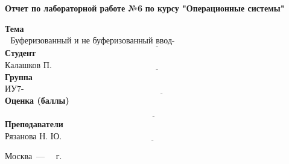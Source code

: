 \begin{titlepage}
	
	\begin{center}
		\Large\textbf{  Отчет по лабораторной работе №6 }
		\textbf{по курсу "Операционные системы"}
	\end{center}
	
\noindent\textbf{Тема} $\underline{\text{~~Буферизованный и не буферизованный ввод-вывод~~~~~~~~~~~~~~~~~~~~~~~~~~~~~~~~~~~~~~~~~~~~~~~~~~}}$\newline\newline
\noindent\textbf{Студент} $\underline{\text{Калашков П. А.~~~~~~~~~~~~~~~~~~~~~~~~~~~~~~~~~~~~~~~~~~~~~~~~~~~~~~~~~~~~~~~~~~~~~~~~~~~~~~~~~~~~~~~~~~~~~~~}}$\newline\newline
\noindent\textbf{Группа} $\underline{\text{ИУ7-66Б~~~~~~~~~~~~~~~~~~~~~~~~~~~~~~~~~~~~~~~~~~~~~~~~~~~~~~~~~~~~~~~~~~~~~~~~~~~~~~~~~~~~~~~~~~~~~~~~~~~~~~~~~~~}}$\newline\newline
\noindent\textbf{Оценка (баллы)} $\underline{\text{~~~~~~~~~~~~~~~~~~~~~~~~~~~~~~~~~~~~~~~~~~~~~~~~~~~~~~~~~~~~~~~~~~~~~~~~~~~~~~~~~~~~~~~~~~~~~~~~~~~~~~~~~~}}$\newline\newline
\noindent\textbf{Преподаватели} $\underline{\text{Рязанова Н. Ю.~~~~~~~~~~~~~~~~~~~~~~~~~~~~~~~~~~~~~~~~~~~~~~~~~~~~~~~~~~~~~~~~~~~~~~~~~~~~~~~~~~~~~}}$\newline\newline\newline

	
	\begin{center}
		\vfill
		Москва~---~\the\year
		~г.
	\end{center}
	\restoregeometry
\end{titlepage}

